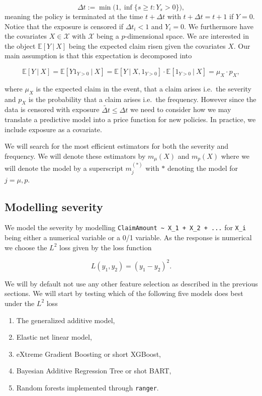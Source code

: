 \documentclass[
]{article}
\providecommand{\tightlist}{%
  \setlength{\itemsep}{0pt}\setlength{\parskip}{0pt}}
\begin{document}
\[
\Delta t := \min\big(1,\inf\{s\ge t : Y_s>0\}\big),
\] meaning the policy is terminated at the time \(t+\Delta t\) with
\(t+\Delta t=t+1\) if \(Y=0\). Notice that the exposure is censored if
\(\Delta t_i<1\) and \(Y_i=0\). We furthermore have the covariates
\(X\in \mathcal X\) with \(\mathcal X\) being a \(p\)-dimensional space.
We are interested in the object \(\mathbb E[Y\ \vert\ X]\) being the
expected claim risen given the covariates \(X\). Our main assumption is
that this expectation is decomposed into

\[
\mathbb E[Y\ \vert\ X]=\mathbb E[Y1_{Y>0}\ \vert\ X]=\mathbb E[Y\ \vert\ X,1_{Y>0}]\cdot \mathbb E[1_{Y>0}\ \vert\ X]=\mu_X\cdot p_X,
\]

where \(\mu_X\) is the expected claim in the event, that a claim arises
i.e.~the severity and \(p_X\) is the probability that a claim arises
i.e.~the frequency. However since the data is censored with exposure
\(\tilde{\Delta t}\le \Delta t\) we need to consider how we may
translate a predictive model into a price function for new policies. In
practice, we include exposure as a covariate.

We will search for the most efficient estimators for both the severity
and frequency. We will denote these estimators by \(m_\mu(X)\) and
\(m_p(X)\) where we will denote the model by a superscript \(m^{(*)}_j\)
with \(*\) denoting the model for \(j=\mu,p\).

\hypertarget{modelling-severity}{%
\subsection{Modelling severity}\label{modelling-severity}}

We model the severity by modelling
\texttt{ClaimAmount\ \textasciitilde{}\ X\_1\ +\ X\_2\ +\ ...} for
\texttt{X\_i} being either a numerical variable or a 0/1 variable. As
the response is numerical we choose the \(L^2\) loss given by the loss
function

\[
L(y_1,y_2)=(y_1-y_2)^2.
\]

We will by default not use any other feature selection as described in
the previous sections. We will start by testing which of the following
five models does best under the \(L^2\) loss

\begin{enumerate}
\def\labelenumi{\arabic{enumi}.}
\tightlist
\item
  The generalized additive model,
\item
  Elastic net linear model,
\item
  eXtreme Gradient Boosting or short XGBoost,
\item
  Bayesian Additive Regression Tree or shot BART,
\item
  Random forests implemented through \texttt{ranger}.
\end{enumerate}
\end{document}
